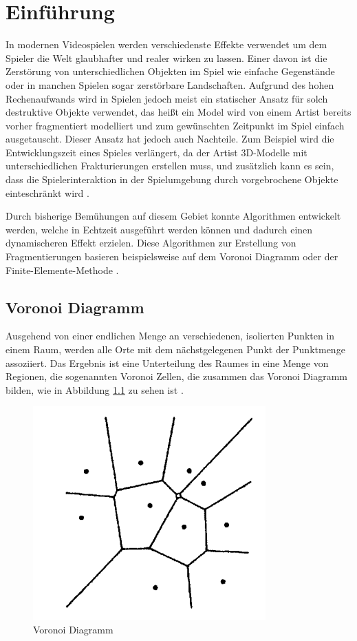 \chapter{Einführung}

In modernen Videospielen werden verschiedenste Effekte verwendet um dem Spieler die Welt glaubhafter und realer wirken zu lassen.
Einer davon ist die Zerstörung von unterschiedlichen Objekten im Spiel wie einfache Gegenstände oder in manchen Spielen sogar zerstörbare Landschaften.
Aufgrund des hohen Rechenaufwands wird in Spielen jedoch meist ein statischer Ansatz für solch destruktive Objekte verwendet, das heißt ein Model wird von einem Artist 
bereits vorher fragmentiert modelliert und zum gewünschten Zeitpunkt im Spiel einfach ausgetauscht. Dieser Ansatz hat jedoch auch Nachteile. 
Zum Beispiel wird die Entwicklungszeit eines Spieles verlängert, da der Artist 3D-Modelle mit unterschiedlichen Frakturierungen erstellen muss,
und zusätzlich kann es sein, dass die Spielerinteraktion in der Spielumgebung durch vorgebrochene Objekte einteschränkt wird \cite{Najim.DynamicFracturing}.

Durch bisherige Bemühungen auf diesem Gebiet konnte Algorithmen entwickelt werden, welche in Echtzeit ausgeführt werden können und dadurch
einen dynamischeren Effekt erzielen. Diese Algorithmen zur Erstellung von Fragmentierungen basieren beispielsweise auf dem Voronoi Diagramm
oder der Finite-Elemente-Methode \cite{Parker.Real-TimeDeformation}.


\section{Voronoi Diagramm}

Ausgehend von einer endlichen Menge an verschiedenen, isolierten Punkten in einem Raum, werden alle Orte mit dem nächstgelegenen Punkt der Punktmenge assoziiert.
Das Ergebnis ist eine Unterteilung des Raumes in eine Menge von Regionen, die sogenannten Voronoi Zellen, die zusammen das Voronoi Diagramm bilden, 
wie in Abbildung \ref{fig:voronoi1} zu sehen ist \cite{Okabe.SpatialTessellationsVoronoi}.



\begin{figure}[H]
    \centering
    \includegraphics[width=0.35\linewidth]{PICs/voronoi.PNG}
    \caption{Voronoi Diagramm \protect\cite{Okabe.SpatialTessellationsVoronoi}}
    \label{fig:voronoi1}
\end{figure}

